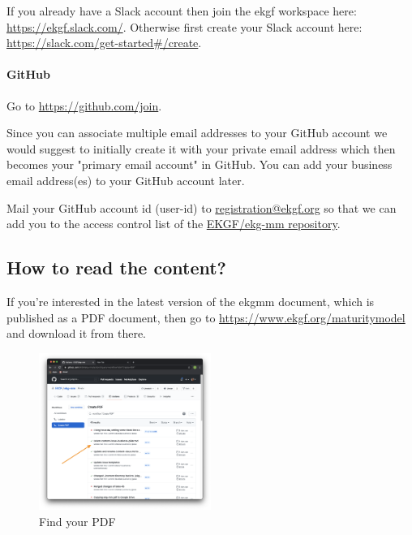 If you already have a Slack account then join the \gls{ekgf} workspace here: \url{https://ekgf.slack.com/}.
Otherwise first create your Slack account here: \url{https://slack.com/get-started\#/create}.

\paragraph{GitHub}

Go to \url{https://github.com/join}.

Since you can associate multiple email addresses to your GitHub account we would
suggest to initially create it with your private email address which then becomes
your "primary email account" in GitHub.
You can add your business email address(es) to your GitHub account later.

Mail your GitHub account id (user-id) to
\href{mailto:registration@ekgf.org}{registration@ekgf.org} so that we can add you
to the access control list of the \href{https://github.com/EKGF/ekg-mm}{EKGF/ekg-mm repository}.

\pagebreak
\subsection{How to read the content?}

If you’re interested in the latest version of the \gls{ekgmm} document,
which is published as a PDF document, then go to
\url{https://www.ekgf.org/maturitymodel} and download it from there.

\begin{figure}
    \vspace{-12pt}
    \begin{center}
        \includegraphics[width=0.50\textwidth]{../images/ekgmm-process-create-pdf-workflow.png}
    \end{center}
    \caption{Find your PDF}
    \label{fig:ekgmm-process-find-your-pdf}
\end{figure}

